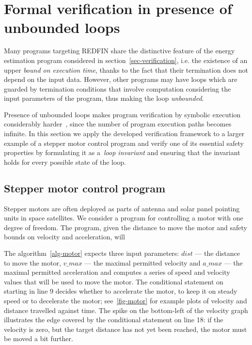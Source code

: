 \section{Formal verification in presence of unbounded loops\label{sec-motor-control}}

Many programs targeting REDFIN share the distinctive feature of
the energy estimation program considered in section~\ref{sec-verification},
i.e. the existence of an  upper \emph{bound on execution time},
thanks to the fact that their termination does not
depend on the input data. However, other programs may have loops
which are guarded by termination conditions that involve computation
considering the input parameters of the program, thus making the loop
\emph{unbounded}.

Presence of unbounded loops makes program verification by symbolic execution considerably
harder~\cite[p.~50:20]{SurveySymExec-CSUR18}, since the number of program execution
paths becomes infinite. In this section we apply the developed verification framework
to a larger example of a stepper motor control program and verify one of its essential
safety properties by formulating it as a~\emph{loop invariant} and ensuring that the
invariant holds for every possible state of the loop.

\subsection{Stepper motor control program}

Stepper motors are often deployed as parts of antenna and solar panel pointing units
in space satellites. We consider a program for controlling a motor with
one degree of freedom. The program, given the distance to move the motor and safety
bounds on velocity and acceleration, will

The algorithm~\ref{alg-motor} expects three input
parameters: $dist$ --- the distance to move the motor, $v\_max$ --- the maximal permitted
velocity and $a\_max$ --- the maximal permitted acceleration and computes a series of
speed and velocity values that will be used to move the motor. The conditional statement on
starting in line 9 decides whether to accelerate the motor, to keep it on steady speed or
to decelerate the motor; see~\ref{fig-motor} for example plots of velocity and distance travelled
against time. The spike on the bottom-left of the velocity graph illustrates
the edge covered by the conditional statement on line 18: if the velocity is zero, but the target
distance has not yet been reached, the motor must be moved a bit further.

